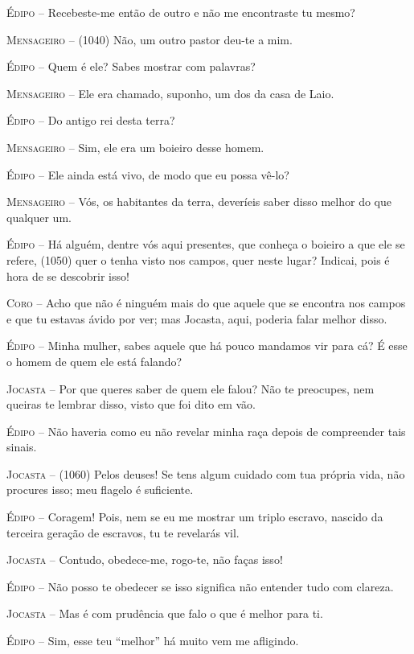 \textsc{Édipo} --   Recebeste-me então de outro e não me encontraste tu mesmo?

\textsc{Mensageiro} --   (1040) Não, um outro pastor deu-te a mim.

\textsc{Édipo} --   Quem é ele? Sabes mostrar com palavras?

\textsc{Mensageiro} --   Ele era chamado, suponho, um dos da casa de Laio.

\textsc{Édipo} --   Do antigo rei desta terra?

\textsc{Mensageiro} --   Sim, ele era um boieiro desse homem.

\textsc{Édipo} --   Ele ainda está vivo, de modo que eu possa vê-lo?

\textsc{Mensageiro} --   Vós, os habitantes da terra, deveríeis saber disso melhor do que
qualquer um.

\textsc{Édipo} --   Há alguém, dentre vós aqui presentes, que conheça o boieiro a que ele se
refere, (1050) quer o tenha visto nos campos, quer neste lugar? Indicai,
pois é hora de se descobrir isso!

\textsc{Coro} --   Acho que não é ninguém mais do que aquele que se encontra nos campos e
que tu estavas ávido por ver; mas Jocasta, aqui, poderia falar melhor
disso.

\textsc{Édipo} --   Minha mulher, sabes aquele que há pouco mandamos vir para cá? É esse o
homem de quem ele está falando?

\textsc{Jocasta} --   Por que queres saber de quem ele falou? Não te preocupes, nem queiras te
lembrar disso, visto que foi dito em vão.

\textsc{Édipo} --   Não haveria como eu não revelar minha raça depois de compreender tais
sinais.

\textsc{Jocasta} --   (1060) Pelos deuses! Se tens algum cuidado com tua própria vida, não
procures isso; meu flagelo é suficiente.

\textsc{Édipo} --   Coragem! Pois, nem se eu me mostrar um triplo escravo, nascido da
terceira geração de escravos, tu te revelarás vil.

\textsc{Jocasta} --   Contudo, obedece-me, rogo-te, não faças isso!

\textsc{Édipo} --   Não posso te obedecer se isso significa não entender tudo com clareza.

\textsc{Jocasta} --   Mas é com prudência que falo o que é melhor para ti.

\textsc{Édipo} --   Sim, esse teu ``melhor'' há muito vem me afligindo.

